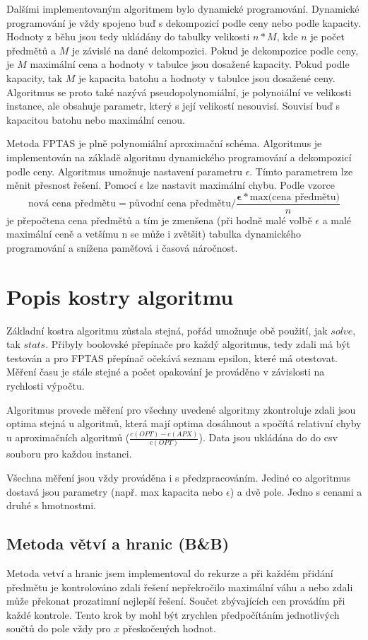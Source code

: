 \documentclass[11pt]{article}
\begin{document}
Dalšími implementovaným algoritmem bylo dynamické programování. Dynamické programování je vždy spojeno buď s dekompozicí podle ceny nebo podle kapacity. 
Hodnoty z běhu jsou tedy ukládány do tabulky velikosti $n*M$, kde $n$ je počet předmětů a $M$ je závislé na dané dekompozici. Pokud je dekompozice podle ceny, je $M$ maximální cena a hodnoty v tabulce jsou dosažené kapacity. Pokud podle kapacity, tak $M$ je kapacita batohu a hodnoty v tabulce jsou dosažené ceny. 
Algoritmus se proto také nazývá pseudopolynomiální, je polynoiální ve velikosti instance, ale obsahuje parametr, který s její velikostí nesouvisí. Souvisí buď s kapacitou batohu nebo maximální cenou. 

Metoda FPTAS je plně polynomiální aproximační schéma. Algoritmus je implementován na základě algoritmu dynamického programování a dekompozicí podle ceny. Algoritmus umožnuje nastavení parametru $\epsilon$. Tímto parametrem lze měnit přesnost řešení. Pomocí $\epsilon$ lze nastavit maximální chybu. Podle vzorce $$\text{nová cena předmětu} = \text{původní cena předmětu}/\frac{\mathbf{\epsilon} *  \text{max(cena předmětu)}}{n}$$ je přepočtena cena předmětů a tím je zmenšena (při hodně malé volbě $\epsilon$ a malé maximální ceně a vetšímu n se může i zvětšit) tabulka dynamického programování a snížena paměťová i časová náročnost.

\section{Popis kostry algoritmu}\label{kap:2}
Základní kostra algoritmu zůstala stejná, pořád umožnuje obě použití, jak $solve$, tak $stats$. Přibyly boolovské přepínače pro každý algoritmus, tedy zdali má být testován a pro FPTAS přepínač očekává seznam epsilon, které má otestovat. Měření času je stále stejné a počet opakování je prováděno v závislosti na rychlosti výpočtu.

Algoritmus provede měření pro všechny uvedené algoritmy zkontroluje zdali jsou optima stejná u algoritmů, která mají optima dosáhnout a spočítá relativní chyby u aproximačních algoritmů ($\frac{c(OPT) - c(APX)}{c(OPT)}$). Data jsou ukládána do do csv souboru pro každou instanci.

Všechna měření jsou vždy prováděna i s předzpracováním. Jediné co algoritmus dostavá jsou parametry (např. max kapacita nebo $\epsilon$) a dvě pole. Jedno s cenami a druhé s hmotnostmi.

\subsection{Metoda větví a hranic (B\&B)}
Metoda vetví a hranic jsem implementoval do rekurze a při každém přidání předmětu je kontrolováno zdali řešení nepřekročilo maximální váhu a nebo zdali může překonat prozatimní nejlepší řešení. Součet zbývajících cen provádím při každé kontrole. Tento krok by mohl být zrychlen předpočítáním jednotlivých součtů do pole vždy pro $x$ přeskočených hodnot. 
\end{document}
